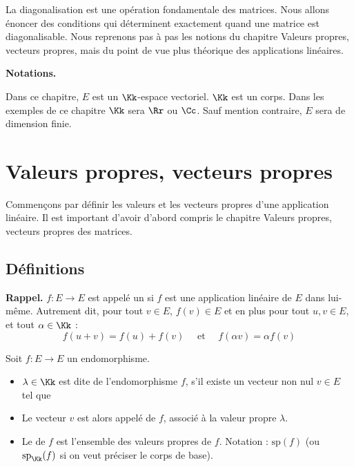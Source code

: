 \documentclass[12pt, class=report,crop=false]{standalone}
\newcommand{\Sp}{\text{sp}}
\begin{document}



La diagonalisation est une opération fondamentale des matrices.
Nous allons énoncer des conditions qui déterminent exactement quand une matrice est diagonalisable.
Nous reprenons pas à pas les notions du chapitre \og{}Valeurs propres, vecteurs propres\fg{},
mais du point de vue plus théorique des applications linéaires.


\textbf{Notations.}

Dans ce chapitre, $E$ est un $\Kk$-espace vectoriel.
$\Kk$ est un corps. Dans les exemples de ce chapitre $\Kk$ sera $\Rr$ ou $\Cc$.
Sauf mention contraire, $E$ sera de dimension finie.

\section{Valeurs propres, vecteurs propres}

Commençons par définir les valeurs et les vecteurs propres d'une application linéaire.
Il est important d'avoir d'abord compris le chapitre \og{}Valeurs propres, vecteurs propres\fg{}
des matrices.

\subsection{Définitions}

\textbf{Rappel.} $f : E \to E$ est appelé un  si $f$ est une application linéaire de $E$ dans lui-même. Autrement dit, pour tout $v\in E$, $f(v) \in E$ et en plus pour tout $u,v \in E$, et tout $\alpha \in \Kk$ :
$$f(u+v) = f(u)+f(v) \quad \text{ et } \quad f(\alpha v) = \alpha f(v)$$

\begin{definition}
Soit $f : E \to E$ un endomorphisme.
\begin{itemize}
  \item $\lambda \in \Kk$ est dite  de l'endomorphisme $f$, s'il
existe un vecteur non nul $v \in E$ tel que 
  \item Le vecteur $v$ est alors appelé  de $f$, associé à la valeur propre $\lambda$.
  
  \item Le  de $f$ est l'ensemble des valeurs propres de $f$. 
  Notation : $\Sp(f)$ (ou $\Sp_\Kk(f)$ si on veut préciser le corps de base). 

\end{itemize}
\end{definition} 
 
\end{document}
